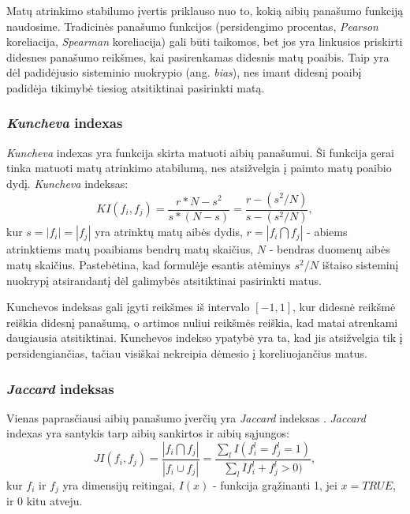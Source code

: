 Matų atrinkimo stabilumo įvertis priklauso nuo to, kokią aibių panašumo funkciją naudosime. Tradicinės panašumo funkcijos (persidengimo procentas, \textit{Pearson} koreliacija, \textit{Spearman} koreliacija) gali būti taikomos, bet jos yra linkusios priskirti didesnes panašumo reikšmes, kai pasirenkamas didesnis matų poaibis. Taip yra dėl padidėjusio sisteminio nuokrypio (ang. \textit{bias}), nes imant didesnį poaibį padidėja tikimybė tiesiog atsitiktinai pasirinkti matą.

\subsubsection{\textit{Kuncheva} indexas}

\textit{Kuncheva} indexas \cite{DBLP:conf/aia/Kuncheva07} yra funkcija skirta matuoti aibių panašumui. Ši funkcija gerai tinka matuoti matų atrinkimo atabilumą, nes atsižvelgia į paimto matų poaibio dydį. \textit{Kuncheva} indeksas:
\begin{equation}
\label{kuncheva_index}
 KI(f_i, f_j)=\frac{r*N - s^2}{s*(N-s)}=\frac{r - (s^2/N)}{s - (s^2/N)},
\end{equation}		
kur $s=|f_i|=|f_j|$ yra atrinktų matų aibės dydis, $r=|f_i \bigcap f_j|$ - abiems atrinktiems matų poaibiams bendrų matų skaičius, $N$ - bendras  duomenų aibės matų skaičius. Pastebėtina, kad formulėje esantis atėminys $s^2/N$ ištaiso sisteminį nuokrypį atsirandantį dėl galimybės atsitiktinai pasirinkti matus. 

Kunchevos indeksas gali įgyti reikšmes iš intervalo $[-1, 1]$, kur didesnė reikšmė reiškia didesnį panašumą, o artimos nuliui reikšmės reiškia, kad matai atrenkami daugiausia atsitiktinai. Kunchevos indekso ypatybė yra ta, kad jis atsižvelgia tik į persidengiančias, tačiau visiškai nekreipia dėmesio į koreliuojančius matus.

\subsubsection{\textit{Jaccard} indeksas}

Vienas paprasčiausi aibių panašumo įverčių yra \textit{Jaccard} indeksas \cite{jaccard1901etude}. \textit{Jaccard} indexas yra santykis tarp aibių sankirtos ir aibių sąjungos:
\begin{equation}
\label{jaccard_index}
 JI(f_i, f_j)=\frac{|f_i \bigcap f_j|}{|f_i \cup f_j|}=\frac{\sum_{l}I(f_i^l=f_j^l=1)}{\sum_{l}I{f_i^l+f_j^l > 0)}}, 
\end{equation}
kur $f_i$ ir $f_j$ yra dimensijų reitingai, $I(x)$ - funkcija grąžinanti 1, jei $x=TRUE$, ir 0 kitu atveju.

